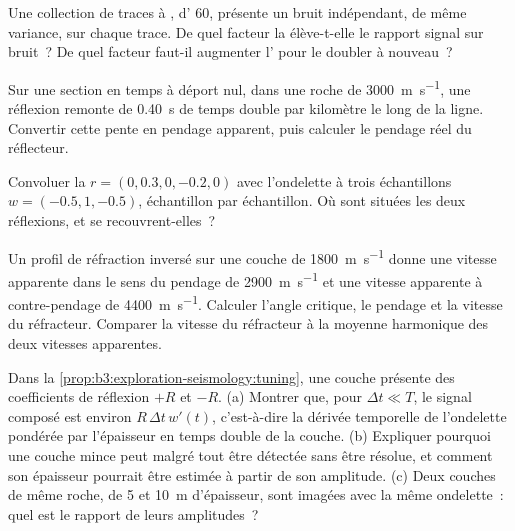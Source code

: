 \begin{exercise}[$\star\star$]\label{exo:b3:exploration-seismology:7}
Une collection de traces à , d' 60, présente un bruit indépendant, de même variance, sur chaque trace. De
quel facteur la  élève-t-elle le rapport signal sur bruit~? De quel facteur
faut-il augmenter l' pour le doubler à nouveau~?
\end{exercise}

\begin{exercise}[$\star\star$]\label{exo:b3:exploration-seismology:8}
Sur une section en temps à déport nul, dans une roche de \qty{3000}{m.s^{-1}}, une réflexion
remonte de \qty{0.40}{s} de temps double par kilomètre le long de la ligne. Convertir cette
pente en pendage apparent, puis calculer le pendage réel du réflecteur.
\end{exercise}

\begin{exercise}[$\star\star$]\label{exo:b3:exploration-seismology:9}
Convoluer la  $r = (0, 0.3, 0, -0.2, 0)$ avec
l'ondelette à trois échantillons $w = (-0.5, 1, -0.5)$, échantillon par échantillon. Où sont situées les deux
réflexions, et se recouvrent-elles~?
\end{exercise}

\begin{exercise}[$\star\star\star$]\label{exo:b3:exploration-seismology:10}
Un profil de réfraction inversé sur une couche de \qty{1800}{m.s^{-1}} donne une
vitesse apparente dans le sens du pendage de \qty{2900}{m.s^{-1}} et une vitesse apparente à contre-pendage de
\qty{4400}{m.s^{-1}}. Calculer l'angle critique, le pendage et la vitesse du
réfracteur. Comparer la vitesse du réfracteur à la moyenne harmonique des deux vitesses
apparentes.
\end{exercise}

\begin{exercise}[$\star\star\star$]\label{exo:b3:exploration-seismology:11}
Dans la \cref{prop:b3:exploration-seismology:tuning}, une couche présente des coefficients de réflexion
$+R$ et $-R$. (a) Montrer que, pour $\Delta t \ll T$, le signal composé est environ
$R\,\Delta t\,w'(t)$, c'est-à-dire la dérivée temporelle de l'ondelette
pondérée par l'épaisseur en temps double de la couche. (b) Expliquer pourquoi une couche mince peut malgré tout être
détectée sans être résolue, et comment son épaisseur pourrait être estimée à partir de
son amplitude. (c) Deux couches de même roche, de 5 et \qty{10}{m} d'épaisseur, sont
imagées avec la même ondelette~: quel est le rapport de leurs amplitudes~?
\end{exercise}

